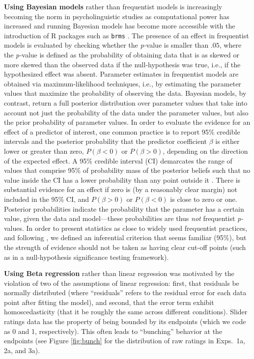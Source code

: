 \documentclass[11pt,fleqn]{article}
\newcommand{\6}{\mbox{$[\hspace*{-.6mm}[$}}
\newcommand{\9}{\mbox{$]\hspace*{-.6mm}]$}}
\begin{document}
\textbf{Using Bayesian models} rather than frequentist models is increasingly becoming the norm in psycholinguistic studies as computational power has increased and running Bayesian models has become more accessible with the introduction of R packages such as \verb|brms| \citep{buerkner2017}. The presence of an effect in frequentist models is evaluated by checking whether the {\em p-}value is smaller than $.05$, where the {\em p-}value is defined as the probability of obtaining data that is as skewed or more skewed than the observed data if the null-hypothesis was true, i.e., if the hypothesized effect was absent. Parameter estimates in frequentist models are obtained via maximum-likelihood techniques, i.e., by estimating the parameter values that maximize the probability of observing the data. Bayesian models, by contrast, return a full posterior distribution over parameter values that take into account not just the probability of the data under the parameter values, but also the prior probability of parameter values. In order to evaluate the evidence for an effect of a predictor of interest, one common practice is to report 95\% credible intervals and the posterior probability that the predictor coefficient $\beta$ is either lower or greater than zero, $P(\beta < 0)$ or $P(\beta > 0)$, depending on the direction of the expected effect. A 95\% credible interval (CI) demarcates the range of values that comprise 95\% of probability mass of the posterior beliefs such that no value inside the CI has a lower probability than any point outside it \citep{Jaynes1976, Morey2016}. There is substantial evidence for an effect if zero is (by a reasonably clear margin) not included in the 95\% CI, and $P(\beta > 0)$ or $P(\beta < 0)$ is close to zero or one. Posterior probabilities indicate the probability that the parameter has a certain value, given the data and model---these probabilities are thus \emph{not} frequentist {\em p-}values. In order to present statistics as close to widely used frequentist practices, and following \citealt{Nicenboim2016}, we defined an inferential criterion that seems familiar (95\%), but the strength of evidence should not be taken as having clear cut-off points (such as in a null-hypothesis significance testing framework).

\textbf{Using Beta regression} rather than linear regression was motivated by the violation of two of the  assumptions of linear regression: first, that residuals be normally distributed (where ``residuals'' refers to the residual error for each data point after fitting the model), and second, that the error term exhibit homoscedasticity (that it be roughly the same across different conditions). Slider ratings data has the property of being bounded by its endpoints (which we code as 0 and 1, respectively). This often leads to ``bunching'' behavior at the endpoints (see Figure \ref{fig:bunch} for the distribution of raw ratings in Exps.~1a, 2a, and 3a). 
\end{document}
